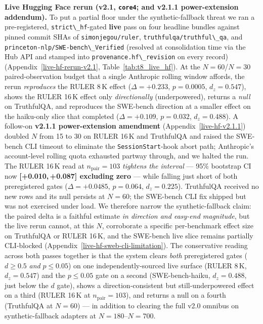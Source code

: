 \textbf{Live Hugging Face rerun (v2.1, \texttt{core4}; and v2.1.1 power-extension addendum).} To put a partial floor under the synthetic-fallback threat we ran a pre-registered, \passthrough{\lstinline!strict\_hf!}-gated \textbf{live} pass on four headline bundles against pinned commit SHAs of \passthrough{\lstinline!simonjegou/ruler!}, \passthrough{\lstinline!truthfulqa/truthful\_qa!}, and \passthrough{\lstinline!princeton-nlp/SWE-bench\_Verified!} (resolved at consolidation time via the Hub API and stamped into \passthrough{\lstinline!provenance.hf\_revision!} on every record) (Appendix~\ref{live-hf-rerun-v2.1}, Table~\ref{tab:t8_live_hf}). At the $N=60$/$N=30$ paired-observation budget that a single Anthropic rolling window affords, the rerun \emph{reproduces} the RULER 8\,K effect ($\Delta=+0.233$, $p=0.0005$, $d_z=0.547$), shows the RULER 16\,K effect only \emph{directionally} (underpowered), returns a \emph{null} on TruthfulQA, and reproduces the SWE-bench direction at a smaller effect on the haiku-only slice that completed ($\Delta=+0.109$, $p=0.032$, $d_z=0.488$). A follow-on \textbf{v2.1.1 power-extension amendment} (Appendix~\ref{live-hf-v2.1.1}) doubled $N$ from 15 to 30 on RULER 16\,K and TruthfulQA and raised the SWE-bench CLI timeout to eliminate the \passthrough{\lstinline!SessionStart!}-hook abort path; Anthropic's account-level rolling quota exhausted partway through, and we halted the run. The RULER 16\,K read at $n_\text{pair}=103$ \emph{tightens the interval} --- 95\% bootstrap CI now \textbf{[+0.010,\,+0.087] excluding zero} --- while falling just short of both preregistered gates ($\Delta=+0.0485$, $p=0.064$, $d_z=0.225$). TruthfulQA received no new rows and its null persists at $N=60$; the SWE-bench CLI fix shipped but was not exercised under load. We therefore narrow the synthetic-fallback claim: the paired delta is a faithful estimate \emph{in direction and easy-end magnitude}, but the live rerun cannot, at this $N$, corroborate a specific per-benchmark effect size on TruthfulQA or RULER 16\,K, and the SWE-bench live slice remains partially CLI-blocked (Appendix~\ref{live-hf-sweb-cli-limitation}). The conservative reading across both passes together is that the system clears \emph{both} preregistered gates ($d \ge 0.5$ \emph{and} $p \le 0.05$) on one independently-sourced live surface (RULER 8\,K, $d_z=0.547$) and the $p \le 0.05$ gate on a second (SWE-bench-haiku, $d_z=0.488$, just below the $d$ gate), shows a direction-consistent but still-underpowered effect on a third (RULER 16\,K at $n_\text{pair}=103$), and returns a null on a fourth (TruthfulQA at $N=60$) --- in addition to clearing the full v2.0 omnibus on synthetic-fallback adapters at $N=180$--$N=700$.

